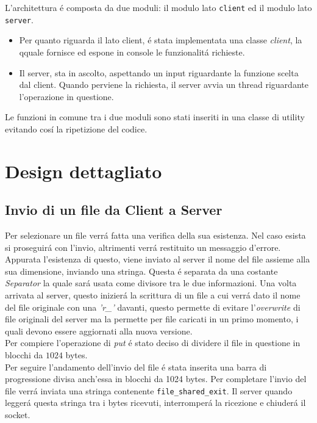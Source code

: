 \documentclass[a4paper, 12pt]{report}
\begin{document}
L'architettura é composta da due moduli: il modulo lato \texttt{client} ed il modulo lato \texttt{server}.
\begin{itemize}
    \item Per quanto riguarda il lato client, é stata implementata una classe \emph{client}, la qquale fornisce ed espone
    in console le funzionalitá richieste.
    \item Il server, sta in ascolto, aspettando un input riguardante la funzione scelta dal client.
    Quando perviene la richiesta, il server avvia un thread riguardante l'operazione in questione.
\end{itemize}
Le funzioni in comune tra i due moduli sono stati inseriti in una classe di utility evitando cosí la ripetizione del codice.

\section{Design dettagliato}
\subsection{Invio di un file da Client a Server}
Per selezionare un file verrá fatta una verifica della sua esistenza. Nel caso esista si proseguirá
con l'invio, altrimenti verrá restituito un messaggio d'errore. Appurata l'esistenza di questo, viene inviato
al server il nome del file assieme alla sua dimensione, inviando una stringa. Questa é separata da una costante \emph{Separator}
la quale sará usata come divisore tra le due informazioni. Una volta arrivata al server, questo inizierá la scrittura
di un file a cui verrá dato il nome del file originale con una \emph{'r\_'} davanti, questo permette di evitare l'\emph{overwrite} di file
originali del server ma la permette per file caricati in un primo momento, i quali devono essere aggiornati alla nuova versione.
\\
Per compiere l'operazione di \emph{put} é stato deciso di dividere il file in questione in blocchi da \(1024\) bytes.
\\
Per seguire l'andamento dell'invio del file é stata inserita una barra di progressione divisa anch'essa in blocchi da 1024 bytes.
Per completare l'invio del file verrá inviata una stringa contenente \texttt{file\_shared\_exit}.
Il server quando leggerá questa stringa tra i bytes ricevuti, interromperá la ricezione e chiuderá il socket.
\end{document}
